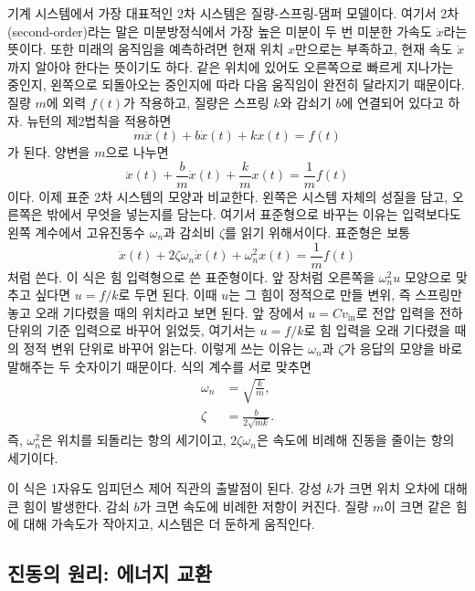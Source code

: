 기계 시스템에서 가장 대표적인 2차 시스템은 질량-스프링-댐퍼 모델이다.
여기서 2차(second-order)라는 말은 미분방정식에서 가장 높은 미분이 두 번 미분한 가속도 $\ddot{x}$라는 뜻이다.
또한 미래의 움직임을 예측하려면 현재 위치 $x$만으로는 부족하고, 현재 속도 $\dot{x}$까지 알아야 한다는 뜻이기도 하다.
같은 위치에 있어도 오른쪽으로 빠르게 지나가는 중인지, 왼쪽으로 되돌아오는 중인지에 따라 다음 움직임이 완전히 달라지기 때문이다.
질량 $m$에 외력 $f(t)$가 작용하고, 질량은 스프링 $k$와 감쇠기 $b$에 연결되어 있다고 하자.
뉴턴의 제2법칙을 적용하면
\begin{equation}
  m \ddot{x}(t) + b \dot{x}(t) + k x(t) = f(t)
  \label{eq:msd}
\end{equation}
가 된다.
양변을 $m$으로 나누면
\begin{equation}
  \ddot{x}(t) + \frac{b}{m}\dot{x}(t) + \frac{k}{m}x(t)
  =
  \frac{1}{m}f(t)
\end{equation}
이다.
이제 표준 2차 시스템의 모양과 비교한다.
왼쪽은 시스템 자체의 성질을 담고, 오른쪽은 밖에서 무엇을 넣는지를 담는다.
여기서 표준형으로 바꾸는 이유는 입력보다도 왼쪽 계수에서 고유진동수 $\omega_n$과 감쇠비 $\zeta$를 읽기 위해서이다.
표준형은 보통
\begin{equation}
  \ddot{x}(t)+2\zeta\omega_n\dot{x}(t)+\omega_n^2x(t)
  =
  \frac{1}{m}f(t)
  \label{eq:msd_standard_form}
\end{equation}
처럼 쓴다.
이 식은 힘 입력형으로 쓴 표준형이다.
앞 장처럼 오른쪽을 $\omega_n^2 u$ 모양으로 맞추고 싶다면 $u=f/k$로 두면 된다.
이때 $u$는 그 힘이 정적으로 만들 변위, 즉 스프링만 놓고 오래 기다렸을 때의 위치라고 보면 된다.
앞 장에서 $u=Cv_{\mathrm{in}}$로 전압 입력을 전하 단위의 기준 입력으로 바꾸어 읽었듯, 여기서는 $u=f/k$로 힘 입력을 오래 기다렸을 때의 정적 변위 단위로 바꾸어 읽는다.
이렇게 쓰는 이유는 $\omega_n$과 $\zeta$가 응답의 모양을 바로 말해주는 두 숫자이기 때문이다.
식의 계수를 서로 맞추면
\begin{align}
  \omega_n &= \sqrt{\frac{k}{m}}, \\
  \zeta &= \frac{b}{2\sqrt{mk}}.
\end{align}
즉, $\omega_n^2$은 위치를 되돌리는 항의 세기이고, $2\zeta\omega_n$은 속도에 비례해 진동을 줄이는 항의 세기이다.

이 식은 1자유도 임피던스 제어 직관의 출발점이 된다.
강성 $k$가 크면 위치 오차에 대해 큰 힘이 발생한다.
감쇠 $b$가 크면 속도에 비례한 저항이 커진다.
질량 $m$이 크면 같은 힘에 대해 가속도가 작아지고, 시스템은 더 둔하게 움직인다.

\subsection{진동의 원리: 에너지 교환}

